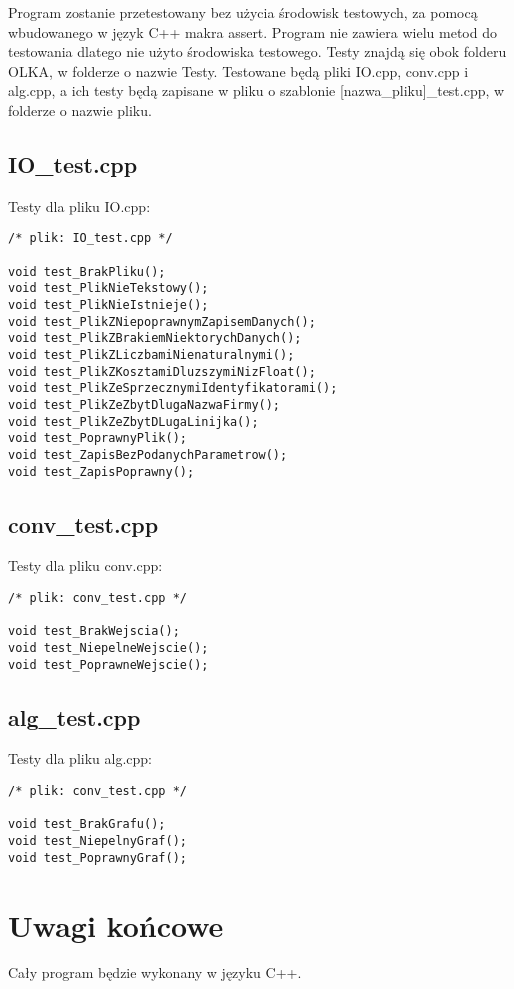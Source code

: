\documentclass{article}
\begin{document}
Program zostanie przetestowany bez użycia środowisk testowych, za pomocą wbudowanego w język C++ makra assert. Program nie zawiera wielu metod do testowania dlatego nie użyto środowiska testowego. Testy znajdą się obok folderu OLKA, w folderze o nazwie Testy. Testowane będą pliki IO.cpp, conv.cpp i alg.cpp,  a ich testy będą zapisane w pliku o szablonie [nazwa\_pliku]\_test.cpp, w folderze o nazwie pliku.

\subsection{IO\_test.cpp}

Testy dla pliku IO.cpp:

\begin{lstlisting}
/* plik: IO_test.cpp */

void test_BrakPliku();
void test_PlikNieTekstowy();
void test_PlikNieIstnieje();
void test_PlikZNiepoprawnymZapisemDanych();
void test_PlikZBrakiemNiektorychDanych();
void test_PlikZLiczbamiNienaturalnymi();
void test_PlikZKosztamiDluzszymiNizFloat();
void test_PlikZeSprzecznymiIdentyfikatorami();
void test_PlikZeZbytDlugaNazwaFirmy();
void test_PlikZeZbytDLugaLinijka();
void test_PoprawnyPlik();
void test_ZapisBezPodanychParametrow();
void test_ZapisPoprawny();
\end{lstlisting}

\subsection{conv\_test.cpp}

Testy dla pliku conv.cpp:

\begin{lstlisting}
/* plik: conv_test.cpp */

void test_BrakWejscia();
void test_NiepelneWejscie();
void test_PoprawneWejscie();
\end{lstlisting}

\subsection{alg\_test.cpp}

Testy dla pliku alg.cpp:

\begin{lstlisting}
/* plik: conv_test.cpp */

void test_BrakGrafu();
void test_NiepelnyGraf();
void test_PoprawnyGraf();
\end{lstlisting}

\section{Uwagi końcowe}

Cały program będzie wykonany w języku C++.
\end{document}
